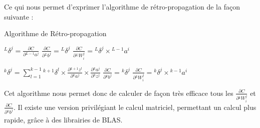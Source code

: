 \documentclass[a4paper, 10pt]{report}
\newcommand{\lexp}[1]{\phantom{}^{#1}}
\newcommand{\elem}[4]{\lexp{#2}#1^{#3}_{#4}}
\begin{document}
Ce qui nous permet d'exprimer l'algorithme de rétro-propagation de la façon suivante :
\begin{algorithm}[H]
	\caption{Algorithme de Rétro-propagation}
	\begin{algorithmic}
		\STATE
		\STATE $\elem{\delta}{L}{j}{} = \frac{\partial C}{\partial \elem{a}{L-1}{j}{}}$
		\STATE $\frac{\partial C}{\partial \elem{b}{L}{j}{}} = \elem{\delta}{L}{j}{}$
		\STATE $\frac{\partial C}{\partial \elem{W}{L}{j}{i}} = \elem{\delta}{L}{j}{} \times \elem{a}{L-1}{i}{}$
		\ENDFOR
		\ENDFOR
						    
		\STATE
		\STATE $\elem{\delta}{k}{j}{} = \sum_{l=1}^{k-1}{\elem{\delta}{k+1}{l}{} \times \frac{\partial \elem{z}{k+1}{l}{}}{\partial \elem{a}{k}{j}{}} \times \frac{\partial \elem{a}{k}{j}{}}{\partial \elem{z}{k}{j}{}}}$
		\STATE $\frac{\partial C}{\partial \elem{b}{k}{j}{}} = \elem{\delta}{k}{j}{}$
		\STATE $\frac{\partial C}{\partial \elem{W}{k}{j}{i}} = \elem{\delta}{k}{j}{}  \times \elem{a}{k-1}{i}{}$
		\ENDFOR
		\ENDFOR
		\ENDFOR
						    
	\end{algorithmic}
\end{algorithm}
Cet algorithme nous permet donc de calculer de façon très efficace tous les $\frac{\partial C}{\partial \elem{W}{k}{j}{i}}$ et $\frac{\partial C}{\partial \elem{b}{k}{j}{}}$.
Il existe une version privilégiant le calcul matriciel, permettant un calcul plus rapide, grâce à des librairies de BLAS.
\end{document}
